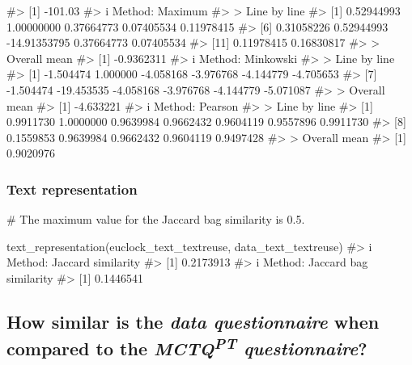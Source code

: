 \documentclass[
  12pt,
  a4paper,
  oneside]{tesesusp}
\newenvironment{Shaded}{\begin{snugshade}}{\end{snugshade}}
\newcommand{\CommentTok}[1]{\textcolor[rgb]{0.37,0.37,0.37}{#1}}
\newcommand{\FunctionTok}[1]{\textcolor[rgb]{0.28,0.35,0.67}{#1}}
\newcommand{\NormalTok}[1]{\textcolor[rgb]{0.00,0.23,0.31}{#1}}
\begin{document}
\begin{Shaded}
\begin{Highlighting}[numbers=left,,]
\CommentTok{\#\textgreater{} [1] {-}101.03}
\CommentTok{\#\textgreater{} i Method: Maximum}
\CommentTok{\#\textgreater{} \textgreater{} Line by line}
\CommentTok{\#\textgreater{}  [1]   0.52944993   1.00000000   0.37664773   0.07405534   0.11978415}
\CommentTok{\#\textgreater{}  [6]   0.31058226   0.52944993 {-}14.91353795   0.37664773   0.07405534}
\CommentTok{\#\textgreater{} [11]   0.11978415   0.16830817}
\CommentTok{\#\textgreater{} \textgreater{} Overall mean}
\CommentTok{\#\textgreater{} [1] {-}0.9362311}
\CommentTok{\#\textgreater{} i Method: Minkowski}
\CommentTok{\#\textgreater{} \textgreater{} Line by line}
\CommentTok{\#\textgreater{}  [1]  {-}1.504474   1.000000  {-}4.058168  {-}3.976768  {-}4.144779  {-}4.705653}
\CommentTok{\#\textgreater{}  [7]  {-}1.504474 {-}19.453535  {-}4.058168  {-}3.976768  {-}4.144779  {-}5.071087}
\CommentTok{\#\textgreater{} \textgreater{} Overall mean}
\CommentTok{\#\textgreater{} [1] {-}4.633221}
\CommentTok{\#\textgreater{} i Method: Pearson}
\CommentTok{\#\textgreater{} \textgreater{} Line by line}
\CommentTok{\#\textgreater{}  [1] 0.9911730 1.0000000 0.9639984 0.9662432 0.9604119 0.9557896 0.9911730}
\CommentTok{\#\textgreater{}  [8] 0.1559853 0.9639984 0.9662432 0.9604119 0.9497428}
\CommentTok{\#\textgreater{} \textgreater{} Overall mean}
\CommentTok{\#\textgreater{} [1] 0.9020976}
\end{Highlighting}
\end{Shaded}

\hypertarget{text-representation}{%
\subsubsection{Text representation}\label{text-representation}}

\begin{Shaded}
\begin{Highlighting}[numbers=left,,]
\CommentTok{\# The maximum value for the Jaccard bag similarity is 0.5.}

\FunctionTok{text\_representation}\NormalTok{(euclock\_text\_textreuse, data\_text\_textreuse)}
\CommentTok{\#\textgreater{} i Method: Jaccard similarity}
\CommentTok{\#\textgreater{} [1] 0.2173913}
\CommentTok{\#\textgreater{} i Method: Jaccard bag similarity}
\CommentTok{\#\textgreater{} [1] 0.1446541}
\end{Highlighting}
\end{Shaded}

\hypertarget{how-similar-is-the-data-questionnaire-when-compared-to-the-mctqpt-questionnaire}{%
\subsection{\texorpdfstring{How similar is the \emph{data questionnaire}
when compared to the \emph{MCTQ\textsuperscript{PT}
questionnaire}?}{How similar is the data questionnaire when compared to the MCTQPT questionnaire?}}\label{how-similar-is-the-data-questionnaire-when-compared-to-the-mctqpt-questionnaire}}
\end{document}
